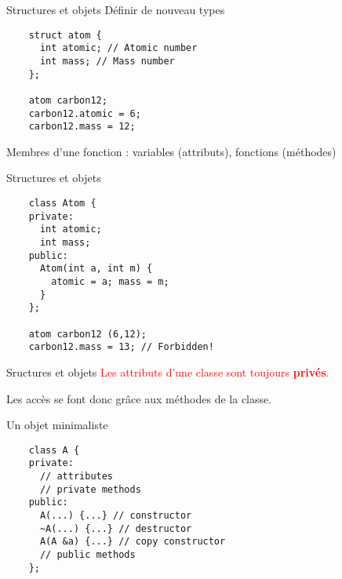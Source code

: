 
\begin{frame}[fragile]{Structures et objets}
  Définir de nouveau types
  \begin{lstlisting}
    struct atom {
      int atomic; // Atomic number
      int mass; // Mass number
    };

    atom carbon12;
    carbon12.atomic = 6;
    carbon12.mass = 12;
  \end{lstlisting}

  Membres d'une fonction : variables (attributs), fonctions (méthodes)
\end{frame}

\begin{frame}[fragile]{Structures et objets}
  \begin{lstlisting}
    class Atom {
    private:
      int atomic;
      int mass;
    public:
      Atom(int a, int m) {
        atomic = a; mass = m;
      }
    };

    atom carbon12 (6,12);
    carbon12.mass = 13; // Forbidden!
  \end{lstlisting}
\end{frame}

\begin{frame}{Sructures et objets}
  \textcolor{red}{Les attributs d'une classe sont toujours \textbf{privés}.}

  Les accès se font donc grâce aux méthodes de la classe.
\end{frame}

\begin{frame}[fragile]{Un objet minimaliste}
  \begin{lstlisting}
    class A {
    private:
      // attributes
      // private methods
    public:
      A(...) {...} // constructor
      ~A(...) {...} // destructor
      A(A &a) {...} // copy constructor
      // public methods
    };
  \end{lstlisting}
\end{frame}